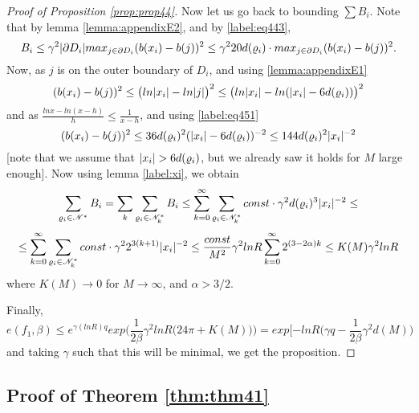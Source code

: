 \documentclass[11pt,reqno]{article}
\DeclarePairedDelimiter\abs{\lvert}{\rvert}%
\theoremstyle{definition}
\numberwithin{equation}{section}
\begin{document}
\begin{proof}[Proof of Proposition \eqref{prop:prop44}]
Now let us go back to bounding $\sum B_i$.
Note that by lemma \eqref{lemma:appendixE2}, and by \eqref{label:eq443}, 
$$
B_i \leq \gamma^2 \abs{\partial D_i} max_{j \in \partial D_i}(b(x_i) - b(j))^2 \leq
\gamma^2 20 d(\varrho_i) \cdot max_{j \in \partial D_i}(b(x_i) - b(j))^2.
$$
Now, as $j$ is on the outer boundary of $D_i$, and using \eqref{lemma:appendixE1}
$$
(b(x_i) - b(j))^2 \leq \big( ln\abs{x_i} - ln\abs{j} \big) ^ 2 \leq
\big( ln\abs{x_i} - ln(\abs{x_i} - 6d(\varrho_i)) \big) ^ 2
$$
and as $\frac{lnx - ln(x-h)}{h} \leq \frac{1}{x-h}$, and using \eqref{label:eq451}
$$
(b(x_i) - b(j))^2 \leq 
36 d(\varrho_i)^2 (\abs{x_i} - 6d(\varrho_i))^{-2} \leq
144 d(\varrho_i)^2 \abs{x_i}^{-2}
$$
[note that we assume that $\abs{x_i} > 6d(\varrho_i)$, but we already saw it holds for $M$ large enough]. Now using lemma \eqref{label:xi}, we obtain
$$
\sum_{\varrho_i \in \ens^*} B_i = \sum_{k} \sum_{\varrho_i \in \ens_k^*}B_i \leq
\sum_{k=0}^\infty \sum_{\varrho_i \in \ens_k^*} const \cdot \gamma^2 d(\varrho_i)^3 \abs{x_i}^{-2} \leq
$$
$$
\leq
\sum_{k=0}^\infty \sum_{\varrho_i \in \ens_k^*} const \cdot \gamma^2 2^{3(k+1)} \abs{x_i}^{-2} \leq 
\frac{const}{M^2} \gamma^2 lnR \sum_{k=0}^\infty 2^{(3-2\alpha)k} \leq K(M)\gamma^2lnR
$$
where $K(M) \rightarrow 0$ for $M \rightarrow \infty$, and $\alpha > 3/2$.

Finally,
$$
e(f_1, \beta) \leq e^{\gamma (lnR) q} exp \Big( \frac{1}{2\beta} \gamma^2 lnR \big( 24\pi + K(M) \big) \Big) = exp[-lnR \big( \gamma q - \frac{1}{2\beta}\gamma^2 d(M) \big)
$$
and taking $\gamma$ such that this will be minimal, we get the proposition.

\end{proof}


\subsection{Proof of Theorem \eqref{thm:thm41}}
\end{document}
